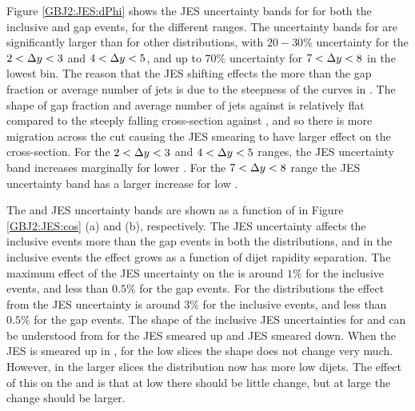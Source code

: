 Figure \ref{GBJ2:JES:dPhi} shows the JES uncertainty bands for \dphiDist{} for both the inclusive and gap events, for the different \dy{} ranges.
The uncertainty bands for \dphiDist{} are significantly larger than for other distributions, with $20-30\%$ uncertainty for the $2<\mbox{$\Delta y$}{}<3$ and $4<\mbox{$\Delta y$}{}<5$, and up to $70\%$ uncertainty for $7<\mbox{$\Delta y$}{}<8$ in the lowest \dphi{} bin.
The reason that the JES shifting effects the \dphiDist{} more than the gap fraction or average number of jets is due to the steepness of the curves in \ptb{}.
The shape of gap fraction and average number of jets against \ptb{} is relatively flat compared to the steeply falling cross-section against \ptb{}, and so there is more migration across the \pt{} cut causing the JES smearing to have larger effect on the cross-section. 
For the $2<\mbox{$\Delta y$}{}<3$ and $4<\mbox{$\Delta y$}{}<5$ ranges, the JES uncertainty band increases marginally for lower \dphi{}.
For the $7<\mbox{$\Delta y$}{}<8$ range the JES uncertainty band has a larger increase for low \dphi{}.

The \mean{\cosdphi{}} and \mean{\costwodphi{}} JES uncertainty bands are shown as a function of \dy{} in Figure \ref{GBJ2:JES:cos} (a) and (b), respectively. 
The JES uncertainty affects the inclusive events more than the gap events in both the distributions, and in the inclusive events the effect grows as a function of dijet rapidity separation.
The maximum effect of the JES uncertainty on the \mean{\cosdphi{}} is around $1\%$ for the inclusive events, and less than $0.5\%$ for the gap events.
For the \mean{\costwodphi{}} distributions the effect from the JES uncertainty is around $3\%$ for the inclusive events, and less than $0.5\%$ for the gap events. 
The shape of the inclusive JES uncertainties for \mean{\cosdphi{}} and \mean{\costwodphi{}} can be understood from \dphiDist{} for the JES smeared up and JES smeared down. 
When the JES is smeared up in \dphiDist{}, for the low \dy{} slices the shape does not change very much.
However, in the larger \dy{} slices the distribution now has more low \dphi{} dijets.
The effect of this on the \mean{\cosdphi{}} and \mean{\costwodphi{}} is that at low \dy{} there should be little change, but at large \dy{} the change should be larger.


